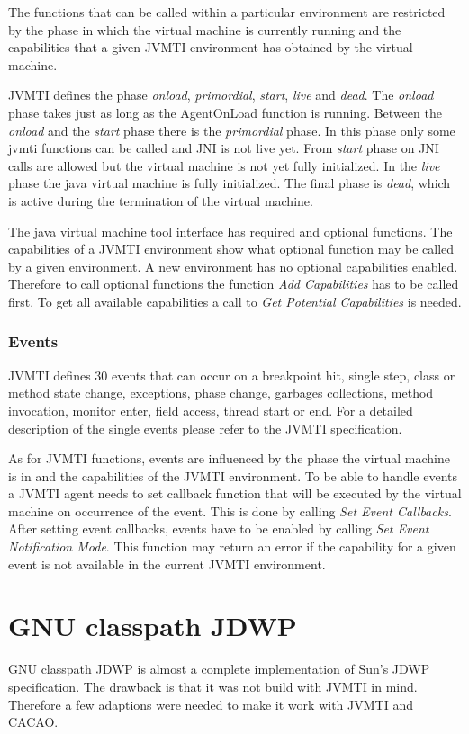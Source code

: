 The functions that can be called within a particular environment are restricted by the phase in which the virtual machine is currently running and the capabilities that a given JVMTI environment has obtained by the virtual machine.

JVMTI defines the phase \textit{onload}, \textit{primordial}, \textit{start}, \textit{live} and \textit{dead}. The \textit{onload} phase takes just as long as the AgentOnLoad function is running. Between the \textit{onload} and the \textit{start} phase there is the \textit{primordial} phase. In this phase only some jvmti functions can be called and JNI is not live yet. From \textit{start} phase on JNI calls are allowed but the virtual machine is not yet fully initialized. In the \textit{live} phase the java virtual machine is fully initialized. The final phase is \textit{dead}, which is active during the termination of the virtual machine.

The java virtual machine tool interface has required and optional functions. The capabilities of a JVMTI environment show what optional function may be called by a given environment. A new environment has no optional capabilities enabled. Therefore to call optional functions the function \textit{Add Capabilities} has to be called first. To get all available capabilities a call to \textit{Get Potential Capabilities} is needed.


\subsubsection{Events}
JVMTI defines 30 events that can occur on a breakpoint hit, single step, class or method state change, exceptions, phase change, garbages collections, method invocation, monitor enter, field access, thread start or end. For a detailed description of the single events please refer to the JVMTI specification\cite{jvmti}.

As for JVMTI functions, events are influenced by the phase the virtual machine is in and the capabilities of the JVMTI environment. To be able to handle events a JVMTI agent needs to set callback function that will be executed by the virtual machine on occurrence of the event. This is done by calling \textit{Set Event Callbacks}. After setting event callbacks, events have to be enabled by calling \textit{Set Event Notification Mode}. This function may return an error if the capability for a given event is not available in the current JVMTI environment.

\section{GNU classpath JDWP} %
GNU classpath JDWP is almost a complete implementation of Sun's JDWP specification. The drawback is that it was not build with JVMTI in mind. Therefore a few adaptions were needed to make it work with JVMTI and CACAO.

